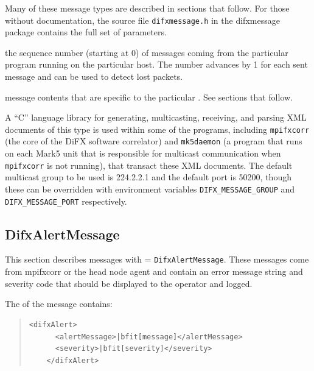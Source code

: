 \begin{description}
\noindent Many of these message types are described in sections that follow.
For those without documentation, the source file {\tt difxmessage.h} in the difxmessage package contains the full set of parameters.

\item[\bfit{seqNum}] the sequence number (starting at 0) of messages coming from the particular program running on the particular host.
The number advances by 1 for each sent message and can be used to detect lost packets.
\item[\bfit{body}] message contents that are specific to the particular .
See sections that follow.
\end{description}

A ``C'' language library for generating, multicasting, receiving, and parsing XML documents of this type is used within some of the programs, including {\tt mpifxcorr} (the core of the DiFX \cite{difx} software correlator) and {\tt mk5daemon} (a program that runs on each Mark5 unit that is responsible for multicast communication when {\tt mpifxcorr} is not running), that transact these XML documents.
The default multicast group to be used is 224.2.2.1 and the default port is 50200, though these can be overridden with environment variables {\tt DIFX\_MESSAGE\_GROUP} and {\tt DIFX\_MESSAGE\_PORT} respectively.







\subsection{DifxAlertMessage} \label{sec:difxalertmessage}

This section describes messages with  = {\tt DifxAlertMessage}.
These messages come from mpifxcorr or the head node agent and contain an error message string and severity code that should be displayed to the operator and logged.

The  of the message contains:

\begin{quotation}
\begin{Verbatim}[commandchars=\|\[\]]
    <difxAlert>
      <alertMessage>|bfit[message]</alertMessage>
      <severity>|bfit[severity]</severity>
    </difxAlert>
\end{Verbatim}
\end{quotation}


